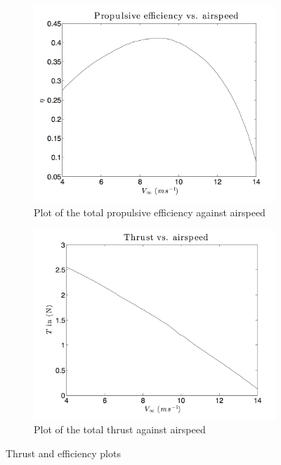 \documentclass[11pt]{article}
\begin{document}
\begin{figure}[h!]
  \centering
    \begin{subfigure}[b]{0.49\textwidth}
                \includegraphics[width=\textwidth]{Figures/PS3/Teff.png}
                \caption{Plot of the total propulsive efficiency against airspeed}
        \end{subfigure}
        \begin{subfigure}[b]{0.49\textwidth}
                \includegraphics[width=\textwidth]{Figures/PS3/Thrust.png}
                \caption{Plot of the total thrust against airspeed}
        \end{subfigure}%
  \caption{Thrust and efficiency plots}\label{fig:teff-thrust}
\end{figure}
\end{document}
